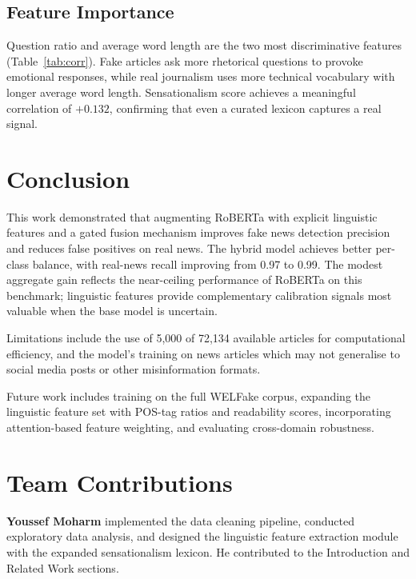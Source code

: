 \documentclass[10pt,twoside]{article}
\begin{document}
\subsection{Feature Importance}

Question ratio and average word length are the two most
discriminative features (Table~\ref{tab:corr}).
Fake articles ask more rhetorical questions to provoke
emotional responses, while real journalism uses more
technical vocabulary with longer average word length.
Sensationalism score achieves a meaningful correlation of
$+0.132$, confirming that even a curated lexicon captures a
real signal.

\section{Conclusion}

This work demonstrated that augmenting RoBERTa with explicit
linguistic features and a gated fusion mechanism improves
fake news detection precision and reduces false positives on
real news.
The hybrid model achieves better per-class balance, with
real-news recall improving from 0.97 to 0.99.
The modest aggregate gain reflects the near-ceiling
performance of RoBERTa on this benchmark; linguistic features
provide complementary calibration signals most valuable when
the base model is uncertain.

Limitations include the use of 5,000 of 72,134 available
articles for computational efficiency, and the model's
training on news articles which may not generalise to social
media posts or other misinformation formats.

Future work includes training on the full WELFake corpus,
expanding the linguistic feature set with POS-tag ratios and
readability scores, incorporating attention-based feature
weighting, and evaluating cross-domain robustness.

\section*{Team Contributions}

\textbf{Youssef Moharm} implemented the data cleaning
pipeline, conducted exploratory data analysis, and designed
the linguistic feature extraction module with the expanded
sensationalism lexicon.
He contributed to the Introduction and Related Work sections.
\end{document}
